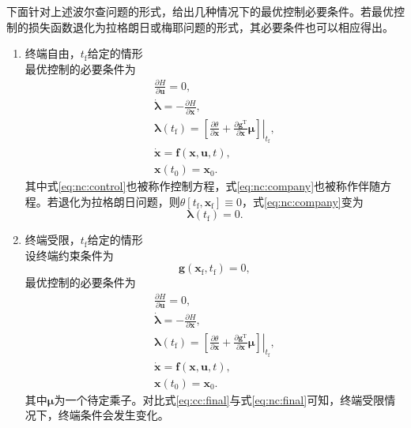 下面针对上述波尔查问题的形式，给出几种情况下的最优控制必要条件。若最优控制的损失函数退化为拉格朗日或梅耶问题的形式，其必要条件也可以相应得出。
\\
\begin{enumerate}
\item {\heiti 终端自由，$t_\mathrm{f}$给定的情形}
\\ 最优控制的必要条件为
\begin{gather}
\frac{\partial H}{\partial\bm{u}}=0,\label{eq:nc:control}\\
\dot{\bm{\lambda}}=-\frac{\partial H}{\partial\bm{x}},\label{eq:nc:company}\\
\bm{\lambda}(t_\mathrm{f})=\left. \left[\frac{\partial \theta}{\partial \bm{x}}+\frac{\partial \bm{g}^\mathrm{T}}{\partial \bm{x}}\bm{\mu}\right]\right|_{t_\mathrm{f}},\label{eq:nc:final}\\
\dot{\bm{x}}=\bm{f}(\bm{x},\bm{u},t),\\
\bm{x}(t_0)=\bm{x}_0.\label{eq:nc:last}
\end{gather}
其中式\eqref{eq:nc:control}也被称作{\heiti 控制方程}，式\eqref{eq:nc:company}也被称作{\heiti 伴随方程}。若退化为拉格朗日问题，则$\theta[t_\mathrm{f},\bm{x}_\mathrm{f}]\equiv 0$，式\eqref{eq:nc:company}变为
\begin{equation}
\bm{\lambda}(t_\mathrm{f})=0.
\end{equation}

\item {\heiti 终端受限，$t_\mathrm{f}$给定的情形}
\\设终端约束条件为
\begin{equation}
\bm{g}(\bm{x}_\mathrm{f},t_\mathrm{f})=0,
\end{equation}
最优控制的必要条件为
\begin{gather}
\frac{\partial H}{\partial\bm{u}}=0,\label{eq:cc:control}\\
\dot{\bm{\lambda}}=-\frac{\partial H}{\partial\bm{x}},\label{eq:cc:company}\\
\bm{\lambda}(t_\mathrm{f})=\left. [\frac{\partial \theta}{\partial \bm{x}}+\frac{\partial \bm{g}^\mathrm{T}}{\partial \bm{x}}\bm{\mu}]\right|_{t_\mathrm{f}},\label{eq:cc:final}\\
\dot{\bm{x}}=\bm{f}(\bm{x},\bm{u},t),\\
\bm{x}(t_0)=\bm{x}_0.\label{eq:cc:last}
\end{gather}
其中$\bm{\mu}$为一个待定乘子。对比式\eqref{eq:cc:final}与式\eqref{eq:nc:final}可知，终端受限情况下，终端条件会发生变化。


\end{enumerate}
